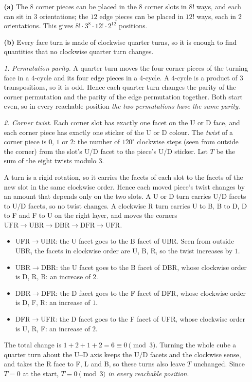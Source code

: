 \textbf{(a)} The $8$ corner pieces can be placed in the $8$ corner slots in $8!$ ways, and each can sit in $3$ orientations; the $12$ edge pieces can be placed in $12!$ ways, each in $2$ orientations. This gives $8!\cdot3^8\cdot12!\cdot2^{12}$ positions.

\textbf{(b)} Every face turn is made of clockwise quarter turns, so it is enough to find quantities that no clockwise quarter turn changes.

\emph{1. Permutation parity.} A quarter turn moves the four corner pieces of the turning face in a $4$-cycle and its four edge pieces in a $4$-cycle. A $4$-cycle is a product of $3$ transpositions, so it is odd. Hence each quarter turn changes the parity of the corner permutation and the parity of the edge permutation together. Both start even, so in every reachable position \emph{the two permutations have the same parity}.

\emph{2. Corner twist.} Each corner slot has exactly one facet on the U or D face, and each corner piece has exactly one sticker of the U or D colour. The \emph{twist} of a corner piece is $0$, $1$ or $2$: the number of $120^\circ$ clockwise steps (seen from outside the corner) from the slot's U/D facet to the piece's U/D sticker. Let $T$ be the sum of the eight twists modulo $3$.

A turn is a rigid rotation, so it carries the facets of each slot to the facets of the new slot in the same clockwise order. Hence each moved piece's twist changes by an amount that depends only on the two slots. A U or D turn carries U/D facets to U/D facets, so no twist changes. A clockwise R turn carries U to B, B to D, D to F and F to U on the right layer, and moves the corners $\text{UFR}\to\text{UBR}\to\text{DBR}\to\text{DFR}\to\text{UFR}$.
\begin{itemize}
\item UFR$\to$UBR: the U facet goes to the B facet of UBR. Seen from outside UBR, the facets in clockwise order are U, B, R, so the twist increases by $1$.
\item UBR$\to$DBR: the U facet goes to the B facet of DBR, whose clockwise order is D, R, B: an increase of $2$.
\item DBR$\to$DFR: the D facet goes to the F facet of DFR, whose clockwise order is D, F, R: an increase of $1$.
\item DFR$\to$UFR: the D facet goes to the F facet of UFR, whose clockwise order is U, R, F: an increase of $2$.
\end{itemize}
The total change is $1+2+1+2=6\equiv0\pmod3$. Turning the whole cube a quarter turn about the U--D axis keeps the U/D facets and the clockwise sense, and takes the R face to F, L and B, so these turns also leave $T$ unchanged. Since $T=0$ at the start, \emph{$T\equiv0\pmod3$ in every reachable position}.

